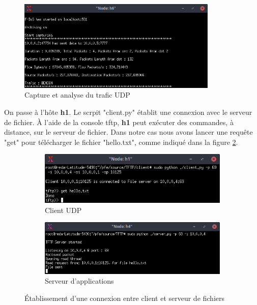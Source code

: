 \begin{figure}[h]
\centering
\includegraphics[width=0.85\textwidth]{Figures/simulation/mininet/IDS/benign_udp}
\decoRule
\caption{Capture et analyse du trafic UDP}
\label{fig:udpTraffic}
\end{figure}

On passe à l'hôte \textbf{h1}. Le scrpit "client.py" établit une connexion avec le serveur de fichier. À l'aide de la console tftp, \textbf{h1} peut exécuter des commandes,  à distance, sur le serveur de fichier. Dans notre cas nous avons lancer une requête "get" pour télécharger le fichier "hello.txt", comme indiqué dans la figure \ref{fig:c/s_TFTP}.
\begin{figure}[h]
\centering
\begin{subfigure}{12.5cm}
\centering
\includegraphics[width=\textwidth]{Figures/simulation/mininet/TFTP/client/benign}
\caption{Client UDP}
\end{subfigure}
\vskip 0.4cm
\begin{subfigure}{12.5cm}
\centering
\includegraphics[width=\textwidth]{Figures/simulation/mininet/TFTP/server/benign_request}
\caption{Serveur d'applications}
\end{subfigure}
\vskip 0.3cm
\decoRule
\caption{Établissement d'une connexion entre client et serveur de fichiers}
\label{fig:c/s_TFTP}
\end{figure}
